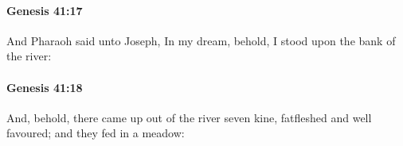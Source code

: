 		\paragraph{Genesis 41:17} %
			\label{GENESIS-41-17}

			And Pharaoh said unto Joseph, In my dream, behold, I stood upon the bank of the river:


		\paragraph{Genesis 41:18} %
			\label{GENESIS-41-18}

			And, behold, there came up out of the river seven kine, fatfleshed and well favoured; and they fed in a meadow:


